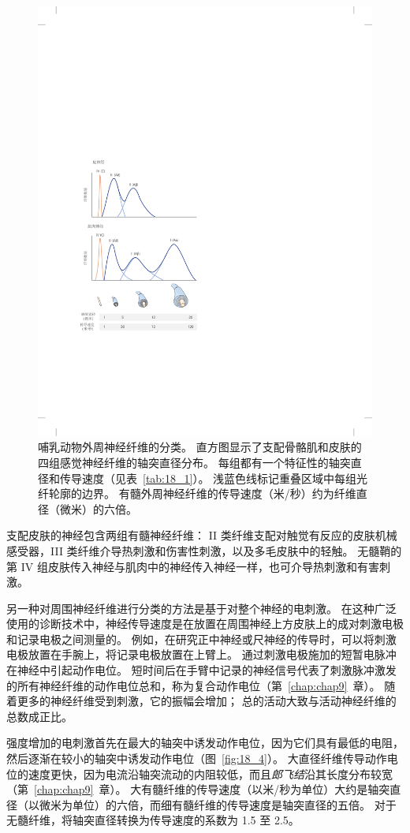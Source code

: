\begin{figure}[htbp]
	\centering
	\includegraphics[width=0.6\linewidth]{chap18/fig_18_3}
	\caption{哺乳动物外周神经纤维的分类。
	直方图显示了支配骨骼肌和皮肤的四组感觉神经纤维的轴突直径分布。
	每组都有一个特征性的轴突直径和传导速度（见表~\ref{tab:18_1}）。
	浅蓝色线标记重叠区域中每组光纤轮廓的边界。
	有髓外周神经纤维的传导速度（米/秒）约为纤维直径（微米）的六倍。}
	\label{fig:18_3}
\end{figure}



支配皮肤的神经包含两组有髓神经纤维：
II 类纤维支配对触觉有反应的皮肤机械感受器，III 类纤维介导热刺激和伤害性刺激，以及多毛皮肤中的轻触。
无髓鞘的第 IV 组皮肤传入神经与肌肉中的神经传入神经一样，也可介导热刺激和有害刺激。


另一种对周围神经纤维进行分类的方法是基于对整个神经的电刺激。
在这种广泛使用的诊断技术中，神经传导速度是在放置在周围神经上方皮肤上的成对刺激电极和记录电极之间测量的。
例如，在研究正中神经或尺神经的传导时，可以将刺激电极放置在手腕上，将记录电极放置在上臂上。
通过刺激电极施加的短暂电脉冲在神经中引起动作电位。
短时间后在手臂中记录的神经信号代表了刺激脉冲激发的所有神经纤维的动作电位总和，称为复合动作电位（第~\ref{chap:chap9}~章）。
随着更多的神经纤维受到刺激，它的振幅会增加；
总的活动大致与活动神经纤维的总数成正比。


强度增加的电刺激首先在最大的轴突中诱发动作电位，因为它们具有最低的电阻，然后逐渐在较小的轴突中诱发动作电位（图~\ref{fig:18_4}）。
大直径纤维传导动作电位的速度更快，因为电流沿轴突流动的内阻较低，而且\textit{郎飞结}沿其长度分布较宽（第~\ref{chap:chap9}~章）。
大有髓纤维的传导速度（以米/秒为单位）大约是轴突直径（以微米为单位）的六倍，而细有髓纤维的传导速度是轴突直径的五倍。
对于无髓纤维，将轴突直径转换为传导速度的系数为 1.5 至 2.5。


